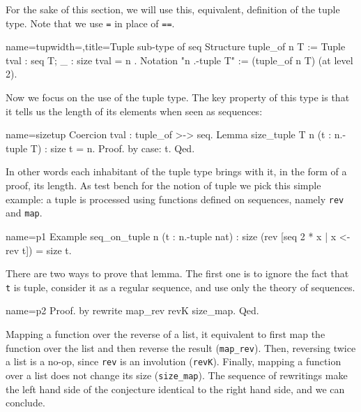 
For the sake of this section, we will use this, equivalent, definition
of the tuple type.  Note that we use \lstinline/=/ in place of
\lstinline/==/.

\begin{coq}{name=tup}{width=\textwidth,title=Tuple sub-type of seq}
Structure tuple_of n T := Tuple { tval : seq T; _ : size tval = n }.
Notation "n .-tuple T" := (tuple_of n T) (at level 2).
\end{coq}


Now we focus on the use of the tuple type.  The key property of this
type is that it tells us the length of its elements when seen as
sequences:

\begin{coq}{name=sizetup}{}
Coercion tval : tuple_of >-> seq.
Lemma size_tuple {T n} (t : n.-tuple T) : size t = n.
Proof. by case: t. Qed.
\end{coq}

In other words each inhabitant of the tuple type brings with it,
in the form of a proof, its length.  As test bench for the notion
of tuple we pick this simple example: a tuple is processed using
functions defined on sequences, namely \lstinline/rev/ and
\lstinline/map/.

\begin{coq}{name=p1}{}
Example seq_on_tuple n (t : n.-tuple nat) :
  size (rev [seq 2 * x | x <- rev t]) = size t.
\end{coq}

There are two ways to prove that lemma.  The first one is
to ignore the fact that \lstinline/t/ is tuple, consider it
as a regular sequence, and use only the theory of sequences.

\begin{coq}{name=p2}{}
Proof. by rewrite map_rev revK size_map. Qed.
\end{coq}

Mapping a function over the reverse of a list, it equivalent to
first map the function over the list and then reverse the result
(\lstinline/map_rev/).  Then, reversing twice a list is a no-op, since
\lstinline/rev/ is an involution
(\lstinline/revK/).  Finally, mapping a function over a list does not
change its size (\lstinline/size_map/).  The sequence of rewritings
make the left hand side of the conjecture identical to the right hand
side, and we can conclude.

